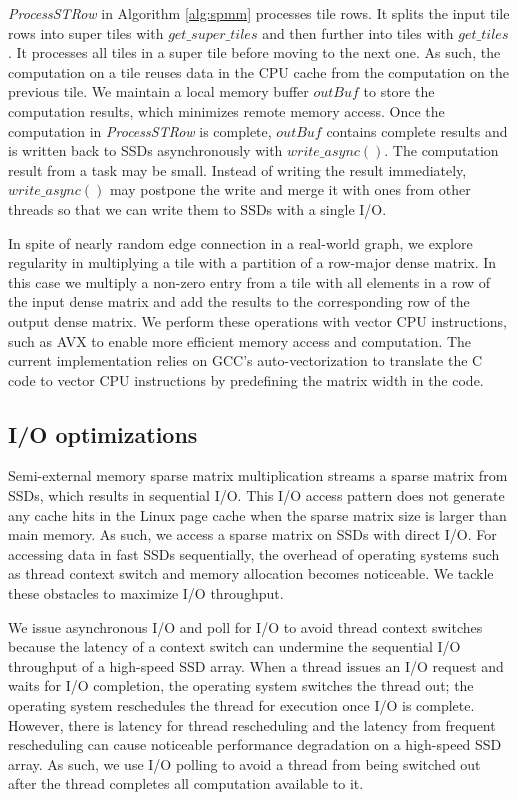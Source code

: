 \textit{ProcessSTRow} in Algorithm \ref{alg:spmm} processes tile rows.
It splits the input tile rows into super tiles with $get\_super\_tiles$ and
then further into tiles with $get\_tiles$. It processes all tiles in a super
tile before moving to the next one. As such, the computation on a tile reuses
data in the CPU cache from the computation on the previous tile. We maintain
a local memory buffer $outBuf$ to store the computation results,
which minimizes remote memory access. Once the computation in \textit{ProcessSTRow}
is complete, $outBuf$ contains complete results and is written back to
SSDs asynchronously with $write\_async()$. The computation result from a task
may be small. Instead of writing the result immediately, $write\_async()$ may
postpone the write and merge it with ones from other threads so that we can
write them to SSDs with a single I/O.

In spite of nearly random edge connection in a real-world graph, we explore
regularity in multiplying a tile with a partition of a row-major dense matrix.
In this case we multiply a non-zero entry from a tile with all elements in
a row of the input dense matrix and add the results to the corresponding row
of the output dense matrix.
We perform these operations with vector CPU instructions, such as
AVX \cite{avx} to enable more efficient memory access and computation.
The current implementation relies on GCC's auto-vectorization
to translate the C code to vector CPU instructions by predefining the matrix
width in the code.

\subsection{I/O optimizations}
Semi-external memory sparse matrix multiplication streams a sparse matrix from
SSDs, which results in sequential I/O. This I/O access pattern does not generate
any cache hits in the Linux page cache when the sparse matrix size is larger
than main memory. As such, we access a sparse matrix on SSDs with direct I/O.
For accessing data in fast SSDs sequentially, the overhead of operating systems
such as thread context switch and memory allocation becomes noticeable.
We tackle these obstacles to maximize I/O throughput.

We issue asynchronous I/O and poll for I/O to avoid thread
context switches because the latency of a context switch can undermine
the sequential I/O throughput of a high-speed SSD array. When a thread issues
an I/O request and waits for I/O completion, the operating system switches
the thread
out; the operating system reschedules the thread for execution once I/O is
complete. However, there is latency for thread rescheduling and the latency
from frequent rescheduling can cause noticeable performance degradation
on a high-speed SSD array. As such, we use I/O polling to avoid a thread from
being switched out after the thread completes all computation available to it.

